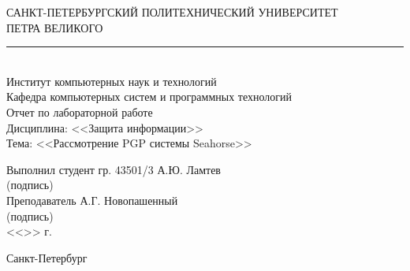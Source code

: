 \begin{titlepage}
\begin{center}
	САНКТ-ПЕТЕРБУРГСКИЙ ПОЛИТЕХНИЧЕСКИЙ УНИВЕРСИТЕТ\\ ПЕТРА ВЕЛИКОГО\\[0.3cm]
	\par\noindent\rule{10cm}{0.4pt}\\[0.3cm]
	Институт компьютерных наук и технологий \\[0.3cm]
	Кафедра компьютерных систем и программных технологий\\[4cm]
	
	Отчет по лабораторной работе\\[3mm]
	Дисциплина: <<Защита информации>>\\[3mm]
	Тема: <<Рассмотрение PGP системы Seahorse>>\\[7cm]
\end{center}

\begin{flushleft}
	\hspace*{5mm} Выполнил студент гр. 43501/3  \hspace*{1.5cm}\sign[3cm]\hfill А.Ю. Ламтев\\
	\hspace*{9.4cm} (подпись)\\[3mm]
	\hspace*{5mm} Преподаватель \hspace*{5.0cm}\sign[3cm]\hfill А.Г. Новопашенный\\
	\hspace*{9.4cm} (подпись)\\[5mm]
	\hspace*{11.1cm} <<\sign[7mm]>> \sign[27mm] \the\year\hspace{1mm} г.
\end{flushleft}

\vfill

\begin{center}
	Санкт-Петербург\\
	\the\year
\end{center}
\end{titlepage}
\addtocounter{page}{1}